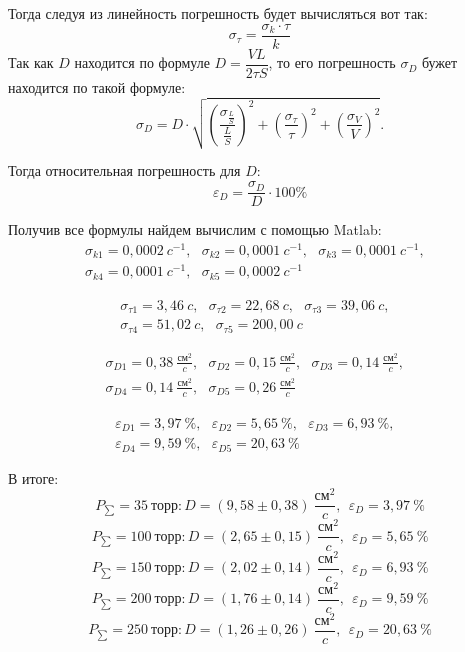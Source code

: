 \documentclass[a4paper,12pt]{article}
\begin{document}
Тогда следуя из линейность погрешность будет вычисляться вот так:
\begin{equation}
	\sigma_\tau = \dfrac{\sigma_k\cdot \tau}{k}
\end{equation}
Так как $D$ находится по формуле $D = \dfrac{VL}{2 \tau S}$, то его погрешность $\sigma_D$ бужет находится по такой формуле:
\begin{equation}
	\sigma_D = D \cdot \sqrt{\left(\dfrac{\sigma_{\frac{L}{S}}}{\frac{L}{S}}\right)^2 + \left(\dfrac{\sigma_{\tau}}{\tau}\right)^2 + \left(\dfrac{\sigma_V}{V}\right)^2}.
\end{equation}

Тогда относительная погрешность для $D$:
\begin{equation}
	\varepsilon_D = \frac{\sigma_D}{D}\cdot 100\%
\end{equation}

Получив все формулы найдем вычислим с помощью Matlab:
\begin{multline}
	\sigma_{k1} = 0,0002\ c^{-1},~~~\sigma_{k2} = 0,0001\  c^{-1},~~~\sigma_{k3} = 0,0001\ c^{-1},~~~\\
	\sigma_{k4} = 0,0001\ c^{-1},~~~\sigma_{k5} = 0,0002\ c^{-1}~~~
\end{multline}

\begin{multline}
	\sigma_{\tau 1} = 3,46\ c,~~~\sigma_{\tau 2} = 22,68\ c,~~~\sigma_{\tau 3} = 39,06\ c,~~~\\
	\sigma_{\tau 4} = 51,02\ c,~~~\sigma_{\tau 5} = 200,00\ c~~~
\end{multline}

\begin{multline}
	\sigma_{D1} = 0,38\ \frac{\text{см}^2}{c},~~~\sigma_{D2} = 0,15\ \frac{\text{см}^2}{c},~~~\sigma_{D3} = 0,14\ \frac{\text{см}^2}{c},~~~\\
	\sigma_{D4} = 0,14\ \frac{\text{см}^2}{c},~~~\sigma_{D5} = 0,26\ \frac{\text{см}^2}{c}~~~
\end{multline}

\begin{multline}
	\varepsilon_{D1} = 3,97\ \%,~~~\varepsilon_{D2} = 5,65\ \%,~~~\varepsilon_{D3} = 6,93\ \%,~~~\\
	\varepsilon_{D4} = 9,59\ \%,~~~\varepsilon_{D5} = 20,63\ \%~~~
\end{multline}

В итоге:
\[P_{\sum} = 35 \ \text{торр}: D = (9,58 \pm 0,38)\  \frac{\text{см}^2}{c}, \ ~ \varepsilon_{D} = 3,97\ \%\]
\[P_{\sum} = 100\ \text{торр}: D = (2,65 \pm 0,15)\  \frac{\text{см}^2}{c}, \ ~ \varepsilon_{D} = 5,65\ \%\]
\[P_{\sum} = 150\ \text{торр}: D = (2,02 \pm 0,14)\  \frac{\text{см}^2}{c}, \ ~ \varepsilon_{D} = 6,93\ \%\]
\[P_{\sum} = 200\ \text{торр}: D = (1,76 \pm 0,14)\  \frac{\text{см}^2}{c}, \ ~ \varepsilon_{D} = 9,59\ \%\]
\[P_{\sum} = 250\ \text{торр}: D = (1,26 \pm 0,26)\  \frac{\text{см}^2}{c}, \ ~ \varepsilon_{D} = 20,63\ \%\]
\end{document}
